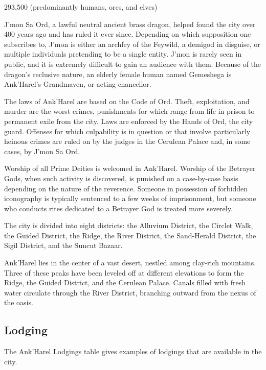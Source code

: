 \documentclass[10pt,a4paper,twoside,bg=print,twocolumn,openany,nodeprecatedcode]{dndbook}
\begin{document}
\begin{description}[nolistsep]
\item[Population.]
293,500 (predominantly humans, orcs, and elves)
\item[Leader.]
J'mon Sa Ord, a lawful neutral ancient brass dragon, helped found the city over 400 years ago and has ruled it ever since. Depending on which supposition one subscribes to, J'mon is either an archfey of the Feywild, a demigod in disguise, or multiple individuals pretending to be a single entity. J'mon is rarely seen in public, and it is extremely difficult to gain an audience with them. Because of the dragon's reclusive nature, an elderly female human named Gemeshega is Ank'Harel's Grandmaven, or acting chancellor.
\item[Laws.]
The laws of Ank'Harel are based on the Code of Ord. Theft, exploitation, and murder are the worst crimes, punishments for which range from life in prison to permanent exile from the city. Laws are enforced by the Hands of Ord, the city guard. Offenses for which culpability is in question or that involve particularly heinous crimes are ruled on by the judges in the Cerulean Palace and, in some cases, by J'mon Sa Ord.
\item[Religion.]
Worship of all Prime Deities is welcomed in Ank'Harel. Worship of the Betrayer Gods, when such activity is discovered, is punished on a case-by-case basis depending on the nature of the reverence. Someone in possession of forbidden iconography is typically sentenced to a few weeks of imprisonment, but someone who conducts rites dedicated to a Betrayer God is treated more severely.
\item[Neighborhoods.]
The city is divided into eight districts: the Alluvium District, the Circlet Walk, the Guided District, the Ridge, the River District, the Sand-Herald District, the Sigil District, and the Suncut Bazaar.
\item[Geography.]
Ank'Harel lies in the center of a vast desert, nestled among clay-rich mountains. Three of these peaks have been leveled off at different elevations to form the Ridge, the Guided District, and the Cerulean Palace. Canals filled with fresh water circulate through the River District, branching outward from the nexus of the oasis.
\end{description}



\subsection{Lodging}
The Ank'Harel Lodgings table gives examples of lodgings that are available in the city.
\end{document}
